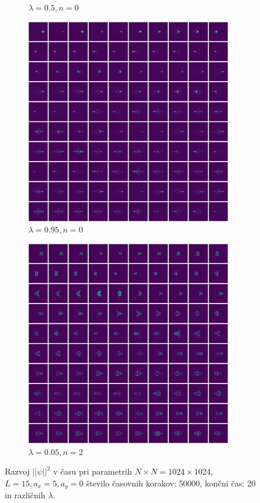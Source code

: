 \documentclass[11pt]{report}
\begin{document}
\begin{figure}[h!]
\begin{subfigure}[b]{0.49\textwidth}
		\caption{$\lambda=0.5, n=0$}
		\label{fig: < >}
	\end{subfigure}
	\hfill
	\begin{subfigure}[b]{0.49\textwidth}
		\centering
		\includegraphics[width=0.98\textwidth]{lam095_0.png}
		\caption{$\lambda=0.95, n=0$}
		\label{fig: < >}
	\end{subfigure}
	\hfill
	\begin{subfigure}[b]{0.49\textwidth}
		\centering
		\includegraphics[width=0.98\textwidth]{lam005_2.png}
		\caption{$\lambda=0.05, n=2$}
		\label{fig: < >}
	\end{subfigure}
	\caption{Razvoj $||\psi ||^2$ v času pri parametrih $N \times N=1024 \times 1024$, $L=15, a_x=5, a_y=0$
		število časovnih korakov: 50000, končni čas: 20 in različnih $\lambda$.}
	\label{fig: 13}
\end{figure}
\end{document}

